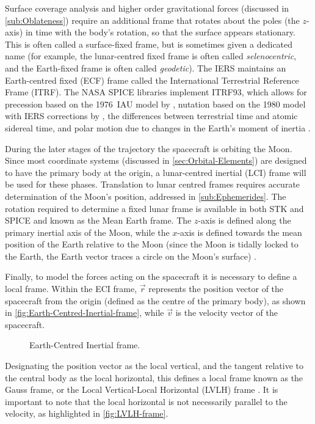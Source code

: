Surface coverage analysis and higher order gravitational forces (discussed in \autoref{sub:Oblateness}) require an additional frame that rotates about the poles (the $z$-axis) in time with the body's rotation, so that the surface appears stationary. This is often called a surface-fixed frame, but is sometimes given a dedicated name (for example, the lunar-centred fixed frame is often called \emph{selenocentric}, and the Earth-fixed frame is often called \emph{geodetic}). The IERS maintains an Earth-centred fixed (ECF) frame called the International Terrestrial Reference Frame (ITRF). The NASA SPICE libraries implement ITRF93, which allows for precession based on the 1976~IAU model by \textcite{Lieske1977}, nutation based on the 1980 model with IERS corrections by \textcite{Herring1986}, the differences between terrestrial time and atomic sidereal time, and polar motion due to changes in the Earth's moment of inertia \parencite{Montenbruck2000}.

During the later stages of the trajectory the spacecraft is orbiting the Moon. Since most coordinate systems (discussed in \autoref{sec:Orbital-Elements}) are designed to have the primary body at the origin, a lunar-centred inertial (LCI) frame will be used for these phases. Translation to lunar centred frames requires accurate determination of the Moon's position, addressed in \autoref{sub:Ephemerides}. The rotation required to determine a fixed lunar frame is available in both STK and SPICE and known as the Mean Earth frame. The $z$-axis is defined along the primary inertial axis of the Moon, while the $x$-axis is defined towards the mean position of the Earth relative to the Moon (since the Moon is tidally locked to the Earth, the Earth vector traces a circle on the Moon's surface) \parencite{LCF}.

Finally, to model the forces acting on the spacecraft it is necessary to define a local frame. Within the ECI frame, $\vec{r}$ represents the position vector of the spacecraft from the origin (defined as the centre of the primary body), as shown in \autoref{fig:Earth-Centred-Inertial-frame}, while $\vec{v}$ is the velocity vector of the spacecraft.
\begin{figure}
\centering
\def\svgwidth{\figurewidth}

\caption{Earth-Centred Inertial frame. %
} \label{fig:Earth-Centred-Inertial-frame}
\end{figure}
Designating the position vector as the local vertical, and the tangent relative to the central body as the local horizontal, this defines a local frame known as the Gauss frame, or the Local Vertical-Local Horizontal (LVLH) frame \parencite{STK}. It is important to note that the local horizontal is not necessarily parallel to the velocity, as highlighted in \autoref{fig:LVLH-frame}.

